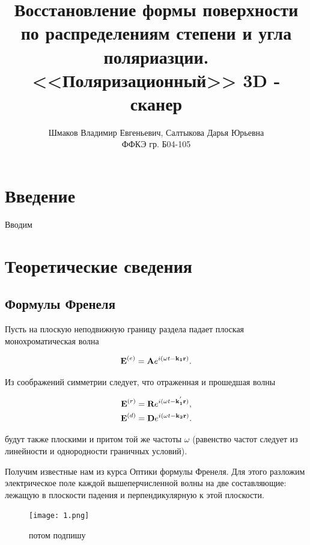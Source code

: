 \documentclass[a4paper]{article}
\title{\textcolor{main_title}{Восстановление формы поверхности по распределениям степени и угла поляриазции. <<Поляризационный>> 3D - сканер}}
\author{Шмаков Владимир Евгеньевич, Салтыкова Дарья Юрьевна \\  ФФКЭ гр. Б04-105}
\begin{document}
\maketitle
                                                                                                                                
\section*{\textcolor{header}{Введение}}

Вводим


\section*{\textcolor{header}{Теоретические сведения}}

\subsection*{\textcolor{sub_header}{Формулы Френеля}}

Пусть на плоскую неподвижную границу раздела падает плоская монохроматическая волна

\begin{equation}
\textbf{E}^{(e)} = \textbf{A} e^{i(\omega t - \bf{k_1 r})}.
\end{equation}

Из соображений симметрии следует, что отраженная и прошедшая волны

\begin{equation}
\begin{gathered}
\textbf{E}^{(r)} = \textbf{R} e^{i(\omega t - \bf{k_1^{'} r})}, \\

\textbf{E}^{(d)} = \textbf{D} e^{i(\omega t - \bf{k_2 r})}.
\end{gathered}
\end{equation}

будут также плоскими и притом той же частоты $\omega$ (равенство частот следует из линейности и однородности граничных условий).

Получим известные нам из курса Оптики формулы Френеля. Для этого разложим электрическое поле каждой вышеперчисленной волны на две составляющие: лежащую в плоскости падения и перпендикулярную к этой плоскости. 

\begin{figure}[htbp]
  \centering
  \texttt{[image: 1.png]}
  \caption{потом подпишу}
  \label{fig:1}
\end{figure}
\end{document}
